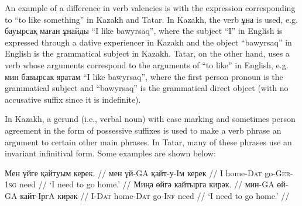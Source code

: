 \documentclass[11pt]{article}
\newcommand{\gmk}[1]{{\qipb\scshape #1}}
\newcommand{\eng}[1]{`#1'}
\begin{document}


An example of a difference in verb valencies is with the expression corresponding to ``to like something'' in Kazakh and Tatar.  In Kazakh, the verb ұна is used, e.g. бауырсақ маған ұнайды ``I like bawyrsaq'', where the subject ``I'' in English is expressed through a dative experiencer in Kazakh and the object ``bawyrsaq'' in English is the grammatical subject in Kazakh.  Tatar, on the other hand, uses a verb whose arguments correspond to the arguments of ``to like'' in English, e.g. мин бавырсак яратам ``I like bawyrsaq'', where the first person pronoun is the grammatical subject and ``bawyrsaq'' is the grammatical direct object (with no accusative suffix since it is indefinite).

In Kazakh, a gerund (i.e., verbal noun) with case marking and sometimes person agreement in the form of possessive suffixes is used to make a verb phrase an argument to certain other main phrases.  In Tatar, many of these phrases use an invariant infinitival form.  Some examples are shown below:

%

\pex[everygla=,everyglb=,everyglc=,aboveglbskip=0pt,aboveglftskip=0ex]  %
\a
\begingl
\gla Мен үйге қайтуым керек. //
\glb мен үй-GA қайт-у-Iм керек //
\glb I home-\gmk{Dat} go-\gmk{Ger}-\gmk{1sg} need //
\glft \eng{I need to go home.} //
\endgl
\a
\begingl
\gla Миңа өйгә кайтырга кирәк. //
\glb мин-GA өй-GA кайт-IргA кирәк //
\glb I-\gmk{Dat} home-\gmk{Dat} go-\gmk{Inf} need //
\glft \eng{I need to go home.} //
\endgl
\xe
\end{document}
